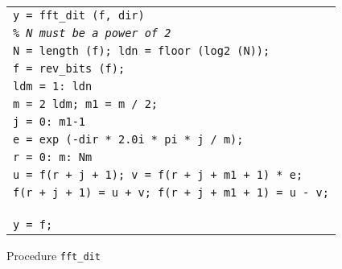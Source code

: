 \begin{listing} \begin{footnotesize}
 
 
\noindent
{\upshape
\begin{tabular}{l} \texttt{\pfunction y = fft\_dit (f, dir)} \\
\texttt{\textit{\% N must be a power of 2}} \\
\texttt{N = length (f); ldn = floor (log2 (N));} \\
\texttt{f = rev\_bits (f);} \\
\texttt{\pfor ldm = 1: ldn} \\
\quad \texttt{m = 2{\hatverb} ldm; m1 = m / 2;} \\
\quad \texttt{\pfor j = 0: m1-1} \\
\quad \quad \texttt{e = exp (-dir * 2.0i * pi * j / m);} \\
\quad \quad \texttt{\pfor r = 0: m: Nm} \\
\quad \quad \quad \texttt{u = f(r + j + 1); v = f(r + j + m1 + 1) * e;} \\
\quad \quad \quad \texttt{f(r + j + 1) = u + v; f(r + j + m1 + 1) = u - v;} \\
\quad \quad \texttt{\pend} \\
\quad \texttt{\pend} \\
\texttt{\pend} \\
\texttt{y = f;} \\
\end{tabular}
}
 
\noindent \end{footnotesize}
 
\caption{Procedure \texttt{\upshape fft\_dit}}
 
\label{listing-fft_dit}
\end{listing}
 
